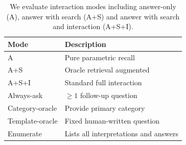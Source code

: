 \begin{table}[t]
\centering

\small
\begin{tabular}{p{}p{}}
\toprule
Mode & Description \\
\midrule
A & Pure parametric recall \\
A+S & Oracle retrieval augmented \\
A+S+I & Standard full interaction \\
\midrule
Always-ask & $\geq 1$ follow-up question \\
Category-oracle & Provide primary category\\
Template-oracle & Fixed human-written question \\
Enumerate & Lists all interpretations and answers \\
\bottomrule
\end{tabular}
\caption{We evaluate interaction modes including answer-only (A), answer with search (A+S) and answer with search and interaction (A+S+I).}
\label{tab:modes}
\end{table}